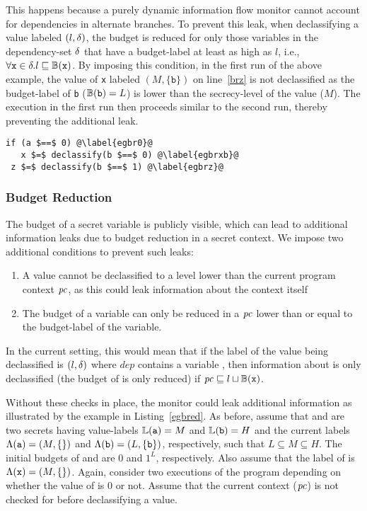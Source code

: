 This happens because a purely dynamic information flow monitor
cannot account for dependencies in alternate branches. To prevent 
this leak, when declassifying a value labeled $(l, \delta)$, the 
budget is reduced for only those variables in the dependency-set 
$\delta$ that have a budget-label at least as high as $l$, i.e., 
$\forall \texttt{x} \in \delta. l \sqsubseteq \mathbb{B}(\texttt{x})$. 
By imposing this condition, in the first run of the above example, 
the value of \texttt{x} labeled $(M, \{\texttt{b}\})$ on line~\ref{brz} 
is not declassified as the budget-label of \texttt{b} 
($\mathbb{B}(\texttt{b}) = L$) is lower than the secrecy-level of the 
value ($M$). The execution in the first run then proceeds 
similar to the second run, thereby preventing the additional leak.  

\begin{lstlisting}[float,caption=Example to illustrate budget reduction,label=egbred]
 if (a $==$ 0) @\label{egbr0}@
   x $=$ declassify(b $==$ 0) @\label{egbrxb}@
 z $=$ declassify(b $==$ 1) @\label{egbrz}@
\end{lstlisting}
\subsubsection{\textbf{Budget Reduction}}
\label{aspect:br}
The budget of a secret variable is publicly visible, which can lead to
additional information leaks due to budget reduction in a secret context. 
We impose two additional conditions to prevent such leaks: 
\begin{enumerate}
\item A value cannot be declassified to a level lower than 
  the current program context $\mathit{pc}$, as this could leak information
  about the context itself
\item The budget of a variable can only be reduced in a $\mathit{pc}$ lower
  than or equal to the budget-label of the variable.
\end{enumerate} 
In the current setting, this would mean that if the 
label of the value being declassified is $(l, \delta)$ where $dep$
contains a variable , then information about  is only
declassified (the budget of  is only reduced) if $\mathit{pc}
\sqsubseteq l \sqcup \mathbb{B}(\texttt{x})$. 

Without these checks in place, the monitor could leak additional
information as illustrated by the example in Listing~\ref{egbred}. 
As before, assume that  and  are two secrets having
value-labels $\mathbb{L}(\texttt{a}) = M$ and $\mathbb{L}(\texttt{b}) = H$ and the
current labels $\Lambda(\texttt{a}) = (M, \{\})$ and $\Lambda(\texttt{b}) = (L,
\{\texttt{b}\})$, respectively, such that $L \subseteq M \subseteq H$.   
The initial budgets of  and  are $0$ and $1^L$,
respectively. Also assume that the label of  is $\Lambda(\texttt{x})
= (M, \{\})$. Again, consider two executions of the program depending
on whether the value of  is $0$ or not. 
Assume that the current context ($\mathit{pc}$) 
is not checked for before declassifying a value. 

